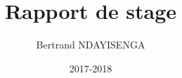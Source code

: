 \documentclass[a4paper,10pt]{report}
\title{Rapport de stage} \let\Title\@title
\author{Bertrand NDAYISENGA} \let\Author\@author
\date{2017-2018} \let\Date\@date
\begin{document}
    

    
    
    
    
    
    
    
    \renewcommand{\contentsname}{Sommaire}
    \tableofcontents
    
    \renewcommand{\listfigurename}{Table des figures}
    \listoffigures
    
    \renewcommand{\glossaryname}{Glossaire}
    \printglossary
    
    
    
    
    
    
\end{document}
